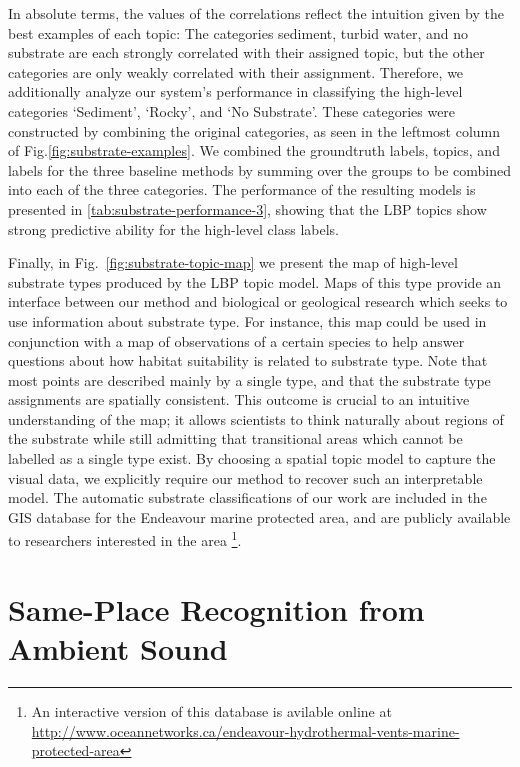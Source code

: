 In absolute terms, the values of the correlations reflect the intuition given by the best examples of each topic: The categories sediment, turbid water, and no substrate are each strongly correlated with their assigned topic, but the other categories are only weakly correlated with their assignment. Therefore, we additionally analyze our system's performance in classifying the high-level categories ‘Sediment’, ‘Rocky’, and ‘No Substrate’. These categories were constructed by combining the original categories, as seen in the leftmost column of Fig.\ref{fig:substrate-examples}. We combined the groundtruth labels, topics, and labels for the three baseline methods by summing over the groups to be combined into each of the three categories. The performance of the resulting models is presented in \ref{tab:substrate-performance-3}, showing that the LBP topics show strong predictive ability for the high-level class labels.

Finally, in Fig.~\ref{fig:substrate-topic-map} we present the map of high-level substrate types produced by the LBP topic model. Maps of this type provide an interface between our method and biological or geological research which seeks to use information about substrate type. For instance, this map could be used in conjunction with a map of observations of a certain species to help answer questions about how habitat suitability is related to substrate type. Note that most points are described mainly by a single type, and that the substrate type assignments are spatially consistent. This outcome is crucial to an intuitive understanding of the map; it allows scientists to think naturally about regions of the substrate while still admitting that transitional areas which cannot be labelled as a single type exist. By choosing a spatial topic model to capture the visual data, we explicitly require our method to recover such an interpretable model. The automatic substrate classifications of our work are included in the GIS database for the Endeavour marine protected area, and are publicly available to researchers interested in the area \citep{Douglas2017} \footnote{An interactive version of this database is avilable online at \url{http://www.oceannetworks.ca/endeavour-hydrothermal-vents-marine-protected-area}}.

\section{Same-Place Recognition from Ambient Sound} \label{sec:audio}

